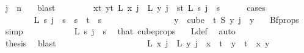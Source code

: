 \begin{isabellebody}
\ {\isacartoucheopen}j\ {\isacharless}{\kern0pt}\ n{\isacartoucheclose}\ {}\ \isamarkupfalse%
\ blast\ \isanewline
\ \ \ \ \isamarkupfalse%
\ \isamarkupfalse%
\ {\isachardoublequoteopen}{\isacharparenleft}{\kern0pt}{\isasymforall}x{\isacharless}{\kern0pt}t{\isachardot}{\kern0pt}\ {\isasymforall}y{\isacharless}{\kern0pt}t{\isachardot}{\kern0pt}\ L\ x\ j\ {\isacharequal}{\kern0pt}\ L\ y\ j{\isacharparenright}{\kern0pt}\ {\isasymor}\ {\isacharparenleft}{\kern0pt}{\isasymforall}s{\isacharless}{\kern0pt}t{\isachardot}{\kern0pt}\ L\ s\ j\ {\isacharequal}{\kern0pt}\ s{\isacharparenright}{\kern0pt}{\isachardoublequoteclose}\isanewline
\ \ \ \ \isamarkupfalse%
\ {\isacharparenleft}{\kern0pt}cases{\isacharparenright}{\kern0pt}\isanewline
\ \ \ \ \ \ \isamarkupfalse%
\ {}\isanewline
\ \ \ \ \ \ \isamarkupfalse%
\ {\isachardoublequoteopen}L\ s\ j\ {\isacharequal}{\kern0pt}\ s{\isachardoublequoteclose}\ \ {\isachardoublequoteopen}s\ {\isacharless}{\kern0pt}\ t{\isachardoublequoteclose}\ \ s\isanewline
\ \ \ \ \ \ \isamarkupfalse%
{\isacharminus}{\kern0pt}\isanewline
\ \ \ \ \ \ \ \ \isamarkupfalse%
\ {\isachardoublequoteopen}{\isasymforall}y\ {\isasymin}\ cube\ {}\ t{\isachardot}{\kern0pt}\ {\isacharparenleft}{\kern0pt}S\ y{\isacharparenright}{\kern0pt}\ j\ {\isacharequal}{\kern0pt}\ y\ {}{\isachardoublequoteclose}\ \isamarkupfalse%
\ Bf{\isacharunderscore}{\kern0pt}props\ {}\ \isamarkupfalse%
\ simp\isanewline
\ \ \ \ \ \ \ \ \isamarkupfalse%
\ \isamarkupfalse%
\ {\isachardoublequoteopen}L\ s\ j\ {\isacharequal}{\kern0pt}\ s{\isachardoublequoteclose}\ \isamarkupfalse%
\ that\ cube{\isacharunderscore}{\kern0pt}props{\isacharparenleft}{\kern0pt}{}{\isacharcomma}{\kern0pt}{}{\isacharparenright}{\kern0pt}\ \ \isamarkupfalse%
\ L{\isacharunderscore}{\kern0pt}def\ \isamarkupfalse%
\ auto\isanewline
\ \ \ \ \ \ \isamarkupfalse%
\isanewline
\ \ \ \ \ \ \isamarkupfalse%
\ \isamarkupfalse%
\ {\isacharquery}{\kern0pt}thesis\ \isamarkupfalse%
\ blast\isanewline
\ \ \ \ \isamarkupfalse%
\isanewline
\ \ \ \ \ \ \isamarkupfalse%
\ {}\isanewline
\ \ \ \ \ \ \isamarkupfalse%
\ {\isachardoublequoteopen}L\ x\ j\ {\isacharequal}{\kern0pt}\ L\ y\ j{\isachardoublequoteclose}\ \ {\isachardoublequoteopen}x\ {\isacharless}{\kern0pt}\ t{\isachardoublequoteclose}\ \ {\isachardoublequoteopen}y\ {\isacharless}{\kern0pt}\ t{\isachardoublequoteclose}\ \ x\ y\isanewline

\end{isabellebody}
